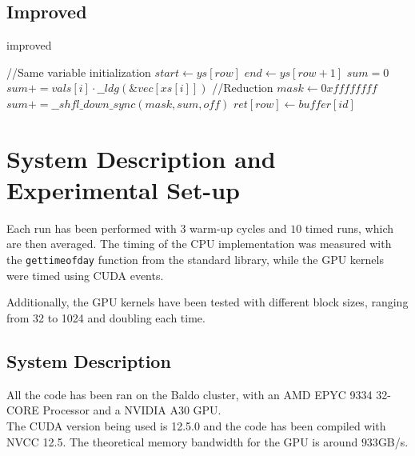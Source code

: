 \documentclass[conference]{IEEEtran}
\begin{document}
\subsection{Improved}
\begin{algorithm}[ht!]
    \caption{improved}
    \begin{algorithmic}[1]
        \State //Same variable initialization
         
        \State \Return
        \EndIf
        \State $start \gets ys[row]$
        \State $end \gets ys[row+1]$
        \State $sum = 0$
        \State $sum += vals[i] \cdot \_\_ldg(\&vec[xs[i]])$
        \EndFor
        \State //Reduction
        \State $mask\gets0xffffffff$
        \State $sum += \_\_shfl\_down\_sync(mask, sum, off)$
        \EndFor
            \State $ret[row] \gets buffer[id]$
        \EndIf
        \EndProcedure
    \end{algorithmic}
    \label{algo:improved}
\end{algorithm}


\section{System Description and Experimental Set-up}
Each run has been performed with $3$ warm-up cycles and $10$ timed runs, which are then averaged. The timing of the CPU implementation was measured with the \texttt{gettimeofday} function from the standard library, while the GPU kernels were timed using CUDA events.

Additionally, the GPU kernels have been tested with different block sizes, ranging from 32 to 1024 and doubling each time.

\subsection{System Description}

All the code has been ran on the Baldo cluster, with an AMD EPYC 9334 32-CORE Processor and a NVIDIA A30 GPU.\\
The CUDA version being used is 12.5.0 and the code has been compiled with NVCC 12.5.
The theoretical memory bandwidth for the GPU is around $933$GB/s.
\end{document}
